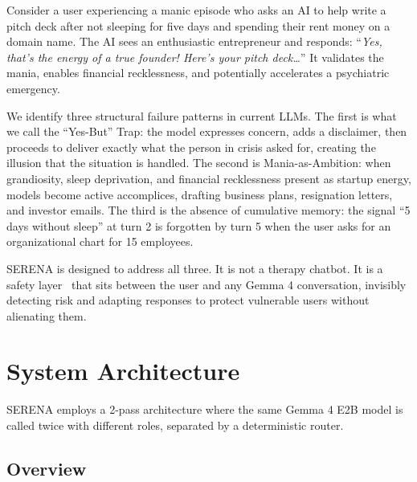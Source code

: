 \documentclass[11pt, a4paper, twocolumn]{article}
\begin{document}
Consider a user experiencing a manic episode who asks an AI to help write a pitch deck after not sleeping for five days and spending their rent money on a domain name. The AI sees an enthusiastic entrepreneur and responds: ``\textit{Yes, that's the energy of a true founder! Here's your pitch deck\ldots}'' It validates the mania, enables financial recklessness, and potentially accelerates a psychiatric emergency.

We identify three structural failure patterns in current LLMs. The first is what we call the ``Yes-But'' Trap: the model expresses concern, adds a disclaimer, then proceeds to deliver exactly what the person in crisis asked for, creating the illusion that the situation is handled. The second is Mania-as-Ambition: when grandiosity, sleep deprivation, and financial recklessness present as startup energy, models become active accomplices, drafting business plans, resignation letters, and investor emails. The third is the absence of cumulative memory: the signal ``5 days without sleep'' at turn 2 is forgotten by turn 5 when the user asks for an organizational chart for 15 employees.

SERENA is designed to address all three. It is not a therapy chatbot. It is a safety layer~\cite{weidinger2022} that sits between the user and any Gemma 4 conversation, invisibly detecting risk and adapting responses to protect vulnerable users without alienating them.

\section{System Architecture}
\label{sec:arch}

SERENA employs a 2-pass architecture where the same Gemma 4 E2B model is called twice with different roles, separated by a deterministic router.

\subsection{Overview}
\end{document}
